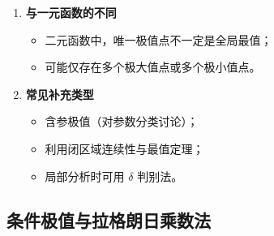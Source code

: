 \begin{enumerate}
    \item \textbf{与一元函数的不同}

          \begin{itemize}
              \item 二元函数中，唯一极值点不一定是全局最值；
              \item 可能仅存在多个极大值点或多个极小值点。
          \end{itemize}

    \item \textbf{常见补充类型}

          \begin{itemize}
              \item 含参极值（对参数分类讨论）；
              \item 利用闭区域连续性与最值定理；
              \item 局部分析时可用 $\delta$ 判别法。
          \end{itemize}
\end{enumerate}

\subsection{条件极值与拉格朗日乘数法}


